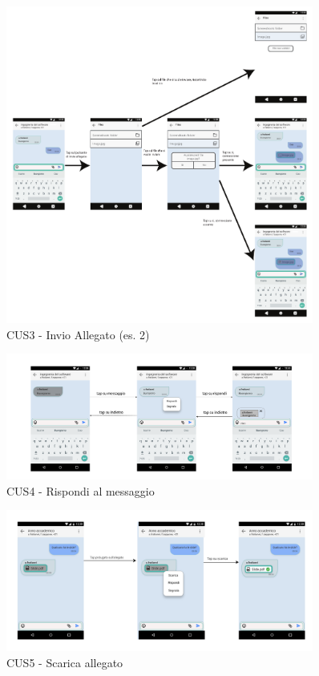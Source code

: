 \begin{figure}
	\centering
	\includegraphics[width=0.9\textwidth]{imgs/gruppo6/activities/act_cus3_invio_allegato2.pdf}
	\caption{CUS3 - Invio Allegato (es. 2)}
	\label{fig:act-cus3-2}
\end{figure}

\begin{figure}
	\centering
	\includegraphics[width=0.9\textwidth]{imgs/gruppo6/activities/act_cus4_rispondi_singolo_messaggio.pdf}
	\caption{CUS4 - Rispondi al messaggio}
	\label{fig:act-cus4}
\end{figure}

\begin{figure}
	\centering
	\includegraphics[width=0.9\textwidth]{imgs/gruppo6/activities/act_cus5_scarica_allegato.pdf}
	\caption{CUS5 - Scarica allegato}
	\label{fig:act-cus5}
\end{figure}

